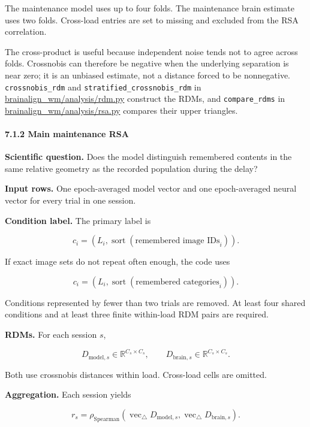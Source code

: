\documentclass[
  10pt,
]{article}
\begin{document}
The maintenance model uses up to four folds. The maintenance brain
estimate uses two folds. Cross-load entries are set to missing and
excluded from the RSA correlation.

The cross-product is useful because independent noise tends not to agree
across folds. Crossnobis can therefore be negative when the underlying
separation is near zero; it is an unbiased estimate, not a distance
forced to be nonnegative. \texttt{crossnobis\_rdm} and
\texttt{stratified\_crossnobis\_rdm} in
\url{brainalign_wm/analysis/rdm.py} construct the RDMs, and
\texttt{compare\_rdms} in \url{brainalign_wm/analysis/rsa.py} compares
their upper triangles.

\hypertarget{main-maintenance-rsa}{%
\paragraph{7.1.2 Main maintenance RSA}\label{main-maintenance-rsa}}

\textbf{Scientific question.} Does the model distinguish remembered
contents in the same relative geometry as the recorded population during
the delay?

\textbf{Input rows.} One epoch-averaged model vector and one
epoch-averaged neural vector for every trial in one session.

\textbf{Condition label.} The primary label is

\[
c_i=(L_i,\operatorname{sort}(\text{remembered image IDs}_i)).
\]

If exact image sets do not repeat often enough, the code uses

\[
c_i=(L_i,\operatorname{sort}(\text{remembered categories}_i)).
\]

Conditions represented by fewer than two trials are removed. At least
four shared conditions and at least three finite within-load RDM pairs
are required.

\textbf{RDMs.} For each session \(s\),

\[
D_{\mathrm{model},s}\in\mathbb R^{C_s\times C_s},
\qquad
D_{\mathrm{brain},s}\in\mathbb R^{C_s\times C_s}.
\]

Both use crossnobis distances within load. Cross-load cells are omitted.

\textbf{Aggregation.} Each session yields

\[
r_s=
\rho_{\mathrm{Spearman}}
\left(
\operatorname{vec}_{\triangle}D_{\mathrm{model},s},
\operatorname{vec}_{\triangle}D_{\mathrm{brain},s}
\right).
\]
\end{document}
